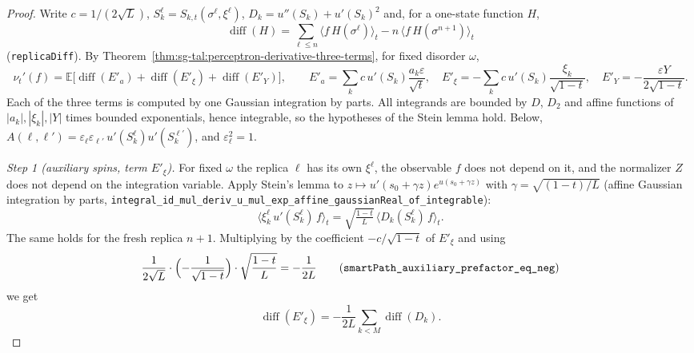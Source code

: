 \begin{proof}
  \leanok
Write $c=1/(2\sqrt L)$, $S^\ell_k=S_{k,t}(\sigma^\ell,\xi^\ell)$, $D_k=u''(S_k)+u'(S_k)^2$ and, for a one-state
function $H$,
\[
 \operatorname{diff}(H)=\sum_{\ell\le n}\langle f\,H(\sigma^\ell)\rangle_t-n\,\langle f\,H(\sigma^{n+1})\rangle_t
\]
(\texttt{replicaDiff}). By Theorem~\ref{thm:sg-tal:perceptron-derivative-three-terms}, for fixed disorder
$\omega$,
\[
 \nu_t'(f)=\mathbb E\bigl[\operatorname{diff}(E'_a)+\operatorname{diff}(E'_\xi)+\operatorname{diff}(E'_Y)\bigr],
 \qquad
 E'_a=\sum_{k}c\,u'(S_k)\frac{a_k\varepsilon}{\sqrt t},\quad
 E'_\xi=-\sum_{k}c\,u'(S_k)\frac{\xi_k}{\sqrt{1-t}},\quad
 E'_Y=-\frac{\varepsilon Y}{2\sqrt{1-t}}.
\]
Each of the three terms is computed by one Gaussian integration by parts. All integrands are bounded by
$D$, $D_2$ and affine functions of $|a_k|,|\xi_k|,|Y|$ times bounded exponentials, hence integrable, so
the hypotheses of the Stein lemma hold. Below, $A(\ell,\ell')=\varepsilon_\ell\varepsilon_{\ell'}\,u'(S^\ell_k)u'(S^{\ell'}_k)$,
and $\varepsilon_\ell^2=1$.

\emph{Step 1 (auxiliary spins, term $E'_\xi$).} For fixed $\omega$ the replica $\ell$ has its own
$\xi^\ell$, the observable $f$ does not depend on it, and the normalizer $Z$ does not depend on the integration
variable. Apply Stein's lemma to $z\mapsto u'(s_0+\gamma z)e^{u(s_0+\gamma z)}$ with
$\gamma=\sqrt{(1-t)/L}$ (affine Gaussian integration by parts, \texttt{integral\_id\_mul\_deriv\_u\_mul\_exp\_affine\_gaussianReal\_of\_integrable}):
\[
 \bigl\langle\xi^\ell_k\,u'(S^\ell_k)\,f\bigr\rangle_t=\sqrt{\tfrac{1-t}{L}}\,\bigl\langle D_k(S^\ell_k)\,f\bigr\rangle_t .
\]
The same holds for the fresh replica $n+1$. Multiplying by the coefficient $-c/\sqrt{1-t}$ of $E'_\xi$ and using
\[
 \frac{1}{2\sqrt L}\cdot\Bigl(-\frac1{\sqrt{1-t}}\Bigr)\cdot\sqrt{\frac{1-t}{L}}=-\frac1{2L}
 \qquad\text{(\texttt{smartPath\_auxiliary\_prefactor\_eq\_neg})}
\]
we get
\[
 \operatorname{diff}(E'_\xi)=-\frac1{2L}\sum_{k<M}\operatorname{diff}(D_k).
\]


\end{proof}
